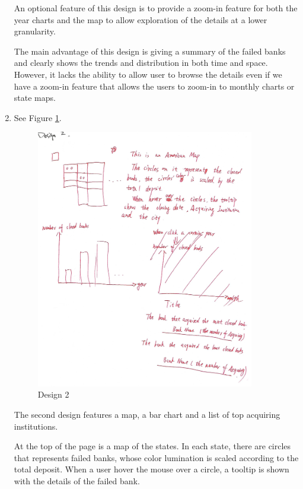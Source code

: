 \documentclass[11pt]{article}
\begin{document}
\begin{enumerate}
        An optional feature of this design is to provide a zoom-in feature for
        both the year charts and the map to allow exploration of the details
        at a lower granularity.

        The main advantage of this design is giving a summary of the failed
        banks and clearly shows the trends and distribution in both time and
        space. However, it lacks the ability to allow user to browse the
        details even if we have a zoom-in feature that allows the users to
        zoom-in to monthly charts or state maps.

    \item See Figure \ref{fig:design_2}.

        \begin{figure}[!h]
            \centering
            \includegraphics[width=0.9\textwidth]{fig/design_2}
            \caption{Design 2}
            \label{fig:design_2}
        \end{figure}

        The second design features a map, a bar chart and a list of top
        acquiring institutions.

        At the top of the page is a map of the states. In each state, there
        are circles that represents failed banks, whose color lumination is
        scaled according to the total deposit. When a user hover the mouse
        over a circle, a tooltip is shown with the details of the failed bank.


\end{enumerate}
\end{document}

